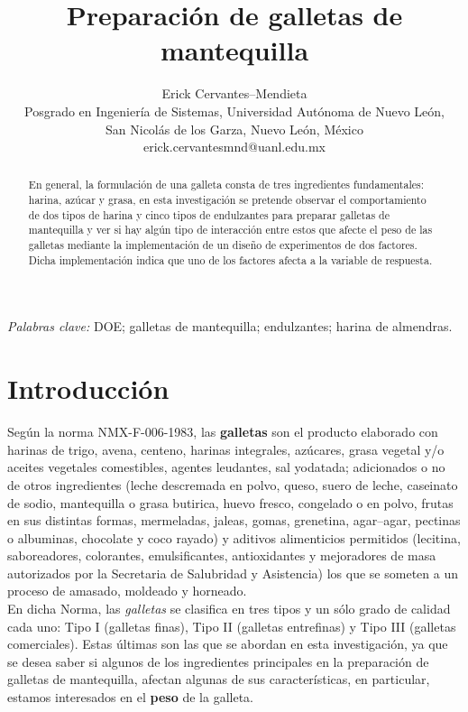 \documentclass[spanish,letterpaper,12pt]{article}
\title{\bf Preparaci\'on de galletas de mantequilla}
\author{Erick Cervantes--Mendieta \\
\normalsize{Posgrado en Ingenier\'ia de Sistemas, Universidad Aut\'onoma de Nuevo Le\'on,} \\
\normalsize{San Nicol\'as de los Garza, Nuevo Le\'on, M\'exico} \\
\normalsize{erick.cervantesmnd@uanl.edu.mx}
}
\date{\empty}
\begin{document}
\pagestyle{empty}

\maketitle

\begin{abstract}

En general, la formulación de una galleta consta de tres ingredientes fundamentales: harina, azúcar y grasa, en esta investigación se pretende observar el comportamiento de dos tipos de harina y cinco tipos de endulzantes para preparar galletas de mantequilla y ver si hay algún tipo de interacción entre estos que afecte el peso de las galletas mediante la implementación de un diseño de experimentos de dos factores. Dicha implementación indica que uno de los factores afecta a la variable de respuesta.

\end{abstract}

\vspace{1em}
\noindent\textit{Palabras clave:}
DOE;
galletas de mantequilla;
endulzantes;
harina de almendras.

\thispagestyle{empty}


%
%
\section{Introducci\'on}
\label{intro}

Según la norma NMX-F-006-1983, las \textbf{galletas} son el producto elaborado con harinas de trigo, avena, centeno, harinas integrales, azúcares, grasa vegetal y/o aceites vegetales comestibles, agentes leudantes, sal yodatada; adicionados o no de otros ingredientes (leche descremada en polvo, queso, suero de leche, caseinato de sodio, mantequilla o grasa butirica, huevo fresco, congelado o en polvo, frutas en sus distintas formas, mermeladas, jaleas, gomas, grenetina, agar--agar, pectinas o albuminas, chocolate y coco rayado) y aditivos alimenticios permitidos (lecitina, saboreadores, colorantes, emulsificantes, antioxidantes y mejoradores de masa autorizados por la Secretaria de Salubridad y Asistencia) los que se someten a un proceso de amasado, moldeado y horneado.\\

En dicha Norma, las \emph{galletas} se clasifica en tres tipos y un sólo grado de calidad cada uno: Tipo I (galletas finas), Tipo II (galletas entrefinas) y Tipo III (galletas comerciales). Estas últimas son las que se abordan en esta investigación, ya que se desea saber si algunos de los ingredientes principales en la preparación de galletas de mantequilla, afectan algunas de sus características, en particular, estamos interesados en el \textbf{peso} de la galleta.\\
\end{document}
